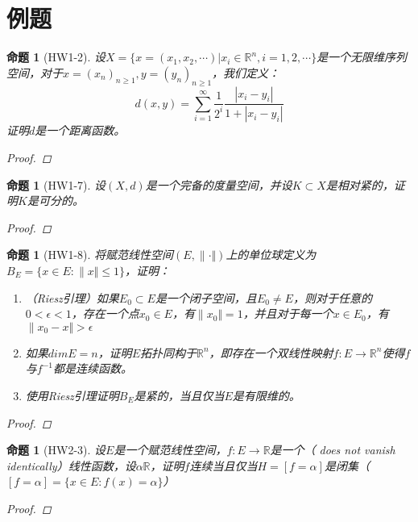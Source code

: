 \documentclass{article}                     %
\numberwithin{equation}{section}            %
\numberwithin{figure}{section}              %
\numberwithin{table}{section}               %
\newtheorem{proposition}[theorem]{\indent 命题}
\begin{document}
\section{例题}
\begin{proposition}[HW1-2]
    设$X=\{x=(x_1,x_2,\cdots)|x_i\in \mathbb{R} ^n,i=1,2,\cdots \}$是一个无限维序列空间，对于$x=(x_n)_{n\ge 1},y=(y_n)_{n\ge 1}$，我们定义：
    $$d(x,y)=\sum_{i=1}^{\infty }\frac{1}{2^i}\frac{|x_i-y_i|}{1+|x_i-y_i|}$$
    证明$d$是一个距离函数。
    \begin{proof}
        
    \end{proof}
\end{proposition}






\begin{proposition}[HW1-7]
    设$(X,d)$是一个完备的度量空间，并设$K\subset X$是相对紧的，证明$K$是可分的。
    \begin{proof}
        
    \end{proof}
\end{proposition}






\begin{proposition}[HW1-8]
    将赋范线性空间$(E,\| \cdot \Vert )$上的单位球定义为$B_E=\{x\in E:\| x\Vert \le 1\}$，证明：
    \begin{enumerate}
        \item （Riesz引理）如果$E_0\subset E$是一个闭子空间，且$E_0\ne E$，则对于任意的$0<\epsilon <1$，存在一个点$x_0\in E$，有$\| x_0\Vert=1 $，并且对于每一个$x\in E_0$，有$\| x_0-x\Vert>\epsilon $
        \item 如果$dim{E}=n$，证明$E$拓扑同构于$\mathbb{R} ^n$，即存在一个双线性映射$f:E\to \mathbb{R} ^n$使得$f$与$f^{-1}$都是连续函数。
        \item 使用Riesz引理证明$B_E$是紧的，当且仅当$E$是有限维的。
    \end{enumerate}
    \begin{proof}
        
    \end{proof}
\end{proposition}






\begin{proposition}[HW2-3]
    设$E$是一个赋范线性空间，$f:E\to \mathbb{R} $是一个（ does not vanish identically）线性函数，设$\alpha \mathbb{R} $，证明$f$连续当且仅当$H=[f=\alpha]$是闭集（$[f=\alpha]=\{x\in E:f(x)=\alpha\}$）
    \begin{proof}
        
    \end{proof}
\end{proposition}
\end{document}
